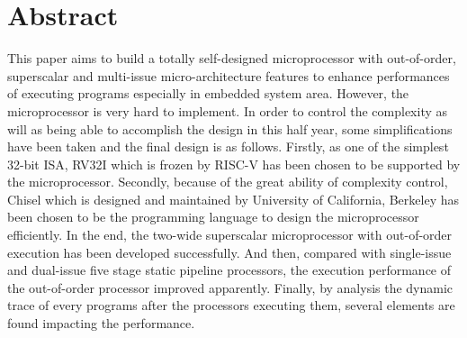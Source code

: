 \chapter*{Abstract}%

This paper aims to build a totally self-designed microprocessor with out-of-order, superscalar and multi-issue micro-architecture features to enhance performances of executing programs especially in embedded system area. However, the microprocessor is very hard to implement. In order to control the complexity as will as being able to accomplish the design in this half year, some simplifications have been taken and the final design is as follows. Firstly, as one of the simplest 32-bit ISA, RV32I which is frozen by RISC-V has been chosen to be supported by the microprocessor. Secondly, because of the great ability of complexity control, Chisel which is designed and maintained by University of California, Berkeley has been chosen to be the programming language to design the microprocessor efficiently. In the end, the two-wide superscalar microprocessor with out-of-order execution has been developed successfully. And then, compared with single-issue and dual-issue five stage static pipeline processors, the execution performance of the out-of-order processor improved apparently. Finally, by analysis the dynamic trace of every programs after the processors executing them, several elements are found impacting the performance.

